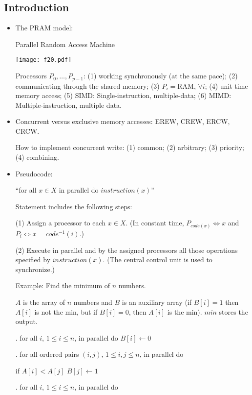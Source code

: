 \documentclass{article}
\begin{document}
\subsection{Introduction}

\begin{itemize}

\item The PRAM model: 

Parallel Random Access Machine

\vskip 0.25cm
\begin{center}
\texttt{[image: f20.pdf]}
\end{center}

Processors $P_0,\ldots,P_{p-1}$: (1) working synchronously (at the same pace);
(2) communicating through the shared memory; (3) $P_i=$RAM, $\forall i$;
(4) unit-time memory access; (5) SIMD: Single-instruction, multiple-data;
(6) MIMD: Multiple-instruction, multiple data.

\item Concurrent versus exclusive memory accesses:
EREW, CREW, ERCW, CRCW.

How to implement concurrent write: (1) common; (2) arbitrary;
(3) priority; (4) combining.

\item Pseudocode:

``for all $x\in X$ in parallel do $instruction(x)$''

Statement includes the following steps:

(1) Assign a processor to each $x\in X$. (In constant time,
$P_{code(x)}\Leftrightarrow x$ and $P_i\Leftrightarrow x=code^{-1}(i)$.)

(2) Execute in parallel and by the assigned processors all those
operations specified by $instruction(x)$. (The central control unit
is used to synchronize.)

Example: Find the minimum of $n$ numbers.

$A$ is the array of $n$ numbers and $B$ is an auxiliary array
(if $B[i]=1$ then $A[i]$ is not the min, but if $B[i]=0$, then
$A[i]$ is the min). 
$min$ stores the output.

. for all $i$, $1\le i\le n$, in parallel do $B[i]\leftarrow 0$

. for all ordered pairs $(i,j)$, $1\le i,j\le n$, in parallel do

\qquad\qquad if $A[i]<A[j]$ $B[j]\leftarrow 1$

. for all $i$, $1\le i\le n$, in parallel do


\end{itemize}
\end{document}
